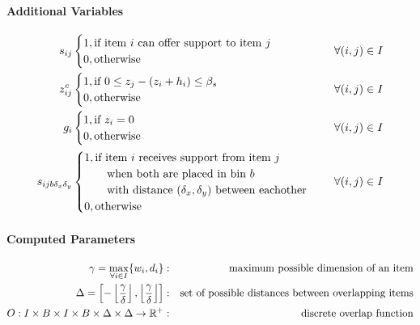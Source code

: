 \paragraph*{Additional Variables}
\begin{eqnarray*}
        s_{ij} & \begin{cases}
                        1, \text{if item $i$ can offer support to item $j$} \\ 
                        0, \text{otherwise}
                    \end{cases} & \forall (i,j) \in I \\
        z^c_{ij} & \begin{cases}
                        1, \text{if $ 0 \le z_j - (z_i + h_i) \le \beta_s$ } \\ 
                        0, \text{otherwise}
                    \end{cases} & \forall (i,j) \in I \\
        g_i & \begin{cases}
                        1, \text{if $z_i = 0$ } \\ 
                        0, \text{otherwise}
                    \end{cases} & \forall (i,j) \in I \\
        s_{i j b \delta_x \delta_y} & \begin{cases}
                    1, \text{if item $i$ receives support from item $j$} \\ \qquad \text{when both are placed in bin $b$} \\ \qquad \text{with distance $(\delta_x, \delta_y)$ between eachother } \\ 
                    0, \text{otherwise}
                \end{cases} & \forall (i,j) \in I
\end{eqnarray*}


\paragraph*{Computed Parameters}
\begin{eqnarray}
    \gamma = \max_{\forall i \in I}\{ w_i, d_i \}  &:& \text{maximum possible dimension of an item} \notag \\
    \Delta =  \left[ - \left\lfloor \frac{ \gamma }{\delta} \right\rfloor, \left\lfloor \frac{ \gamma }{\delta} \right\rfloor \right]  &:& \text{set of possible distances between overlapping items} \notag \\
    O : I \times B \times I \times B \times \Delta \times \Delta \rightarrow \mathbb{R}^+ &:& \text{discrete overlap function} \label{eq:overlap_function}
\end{eqnarray}

